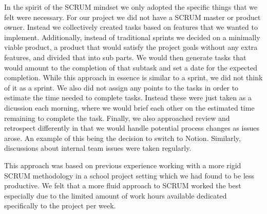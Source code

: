 In the spirit of the SCRUM mindset we only adopted the specific things that we felt were necessary. For our project we did not have a SCRUM master or product owner. Instead we collectively created tasks based on features that we wanted to implement. 
Additionally, instead of traditional sprints we decided on a minimally viable product, a product that would satisfy the project goals without any extra features, and divided that into sub parts. We would then generate tasks that would amount to the completion of that subtask and set a date for the expected completion. While this approach in essence is similar to a sprint, we did not think of it as a sprint. 
We also did not assign any points to the tasks in order to estimate the time needed to complete tasks. Instead these were just taken as a dicussion each morning, where we would brief each other on the estimated time remaining to complete the task.
Finally, we also approached review and retrospect differently in that we would handle potential process changes as issues arose. An example of this being the decision to switch to Notion. Similarly, discussions about internal team issues were taken regularly.

This approach was based on previous experience working with a more rigid SCRUM methodology in a school project setting which we had found to be less productive. We felt that a more fluid approach to SCRUM worked the best especially due to the limited amount of work hours available dedicated specifically to the project per week.



